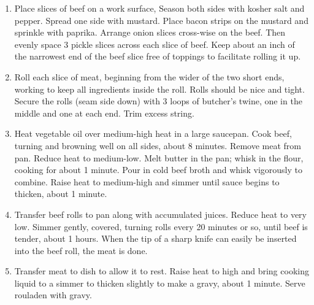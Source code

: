 \begin{enumerate}
  \item Place slices of beef on a work surface, Season both sides with kosher
    salt and pepper. Spread one side with mustard. Place bacon strips on the
    mustard and sprinkle with paprika. Arrange onion slices cross-wise on the
    beef. Then evenly space 3 pickle slices across each slice of beef. Keep
    about an inch of the narrowest end of the beef slice free of toppings to
    facilitate rolling it up.
  \item Roll each slice of meat, beginning from the wider of the two short
    ends, working to keep all ingredients inside the roll. Rolls should be nice
    and tight. Secure the rolls (seam side down) with 3 loops of butcher's
    twine, one in the middle and one at each end. Trim excess string.
  \item Heat vegetable oil over medium-high heat in a large saucepan. Cook
    beef, turning and browning well on all sides, about 8 minutes. Remove meat
    from pan. Reduce heat to medium-low. Melt butter in the pan; whisk in the
    flour, cooking for about 1 minute. Pour in cold beef broth and whisk
    vigorously to combine. Raise heat to medium-high and simmer until sauce
    begins to thicken, about 1 minute.
  \item Transfer beef rolls to pan along with accumulated juices. Reduce heat
    to very low. Simmer gently, covered, turning rolls every 20 minutes or so,
    until beef is tender, about 1  hours. When the tip of a
    sharp knife can easily be inserted into the beef roll, the meat is done.
  \item Transfer meat to dish to allow it to rest. Raise heat to high and bring
    cooking liquid to a simmer to thicken slightly to make a gravy, about 1
    minute. Serve rouladen with gravy.
\end{enumerate}

